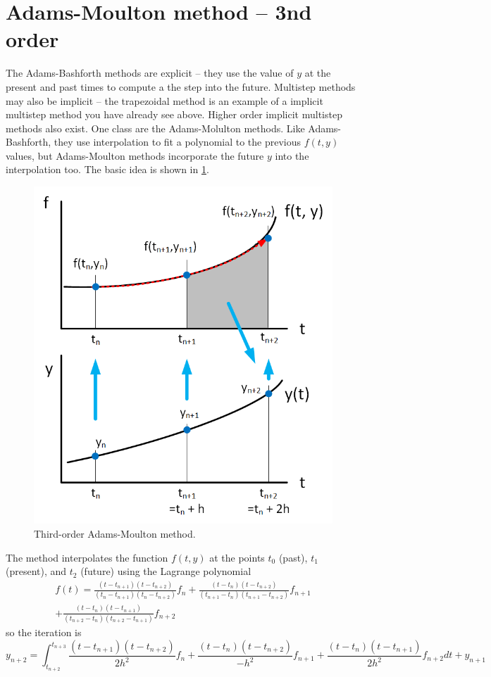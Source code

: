\documentclass[hidelinks,notitlepage]{book}
\begin{document}
\section{Adams-Moulton method -- 3nd order}
The Adams-Bashforth methods are explicit -- they use the value of $y$ at the present and past times to compute a the step into the future.  Multistep methods may also be implicit -- the trapezoidal method is an example of a implicit multistep method you have already see above.  Higher order implicit multistep methods also exist.  One class are the Adams-Molulton methods.  Like Adams-Bashforth, they use interpolation to fit a polynomial to the previous $f(t,y)$ values, but Adams-Moulton methods incorporate the future $y$ into the interpolation too.  The basic idea is shown in \cref{fig:AdamsMoulton3}.  
\begin{figure}[tbh]
	\centering
	\includegraphics[width=0.7\columnwidth]{AdamsMoulton3.png}
	\caption{Third-order Adams-Moulton method.}
	\label{fig:AdamsMoulton3}
\end{figure}
The method interpolates the function $f(t,y)$ at the points $t_0$ (past), $t_1$ (present), and $t_2$ (future) using the Lagrange polynomial
\begin{gather}
f(t) = \frac{(t-t_{n+1})(t-t_{n+2})}{(t_{n}-t_{n+1})(t_{n}-t_{n+2})} f_{n}
+\frac{(t-t_{n})(t-t_{n+2})}{(t_{n+1}-t_{n})(t_{n+1}-t_{n+2})} f_{n+1} \\
\nonumber
+\frac{(t-t_{n})(t-t_{n+1})}{(t_{n+2}-t_{n})(t_{n+2}-t_{n+1})} f_{n+2}
\end{gather}
so the iteration is
\begin{equation}
\label{eq:AdamsMoultonInterpolation}
y_{n+2} = \int_{t_{n+2}}^{t_{n+3}} 
\frac{(t-t_{n+1})(t-t_{n+2})}{2 h^2} f_{n}
+\frac{(t-t_{n})(t-t_{n+2})}{-h^2} f_{n+1}
+\frac{(t-t_{n})(t-t_{n+1})}{2 h^2} f_{n+2}
dt 
+ y_{n+1}
\end{equation}
\end{document}
